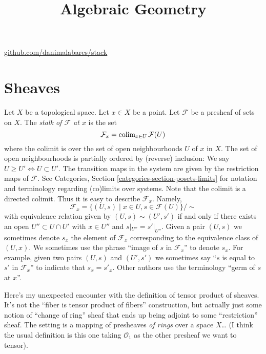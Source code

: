 



\title{Algebraic Geometry}
\maketitle

\label{section-phantom}
\hfill
\href{http://github.com/danimalabares/stack}{github.com/danimalabares/stack}

\tableofcontents

\section{Sheaves}
\label{section-sheaves}

Let $X$ be a topological space. Let $x \in X$ be a point.
Let $\mathcal{F}$ be a presheaf of sets on $X$.
The {\it stalk of $\mathcal{F}$ at $x$} is the set
$$
\mathcal{F}_x
=
\mathop{\mathrm{colim}}\nolimits_{x\in U} \mathcal{F}(U)
$$
where the colimit is over the set of open neighbourhoods
$U$ of $x$ in $X$. The set of open neighbourhoods is
partially ordered by (reverse) inclusion:
We say $U \geq U' \Leftrightarrow U \subset U'$.
The transition maps in the system are
given by the restriction maps of $\mathcal{F}$.
See Categories, Section \ref{categories-section-posets-limits}
for notation and terminology regarding (co)limits over systems.
Note that the colimit is a directed colimit.
Thus it is easy to describe $\mathcal{F}_x$. Namely,
$$
\mathcal{F}_x
=
\{
(U, s)
\mid
x\in U, s\in \mathcal{F}(U)
\}/\sim
$$
with equivalence relation given by $(U, s) \sim (U', s')$ if and only if
there exists an open $U'' \subset U \cap U'$ with $x \in U''$ and
$s|_{U''} = s'|_{U''}$. Given a pair $(U, s)$ we sometimes denote
$s_x$ the element of $\mathcal{F}_x$ corresponding to the equivalence
class of $(U, x)$. We sometimes use the phrase
``image of $s$ in $\mathcal{F}_x$'' to denote $s_x$.
For example, given two pairs $(U, s)$ and $(U', s')$ we sometimes
say ``$s$ is equal to $s'$ in $\mathcal{F}_x$'' to indicate
that $s_x = s'_x$. Other authors use the terminology
``germ of $s$ at $x$''.

\bigskip\noindent

Here's my unexpected encounter with the definition of tensor product of sheaves.
It's not the ``fiber is tensor product of fibers'' construction, but actually
just some notion of ``change of ring'' sheaf that ends up being adjoint to
some ``restriction'' sheaf. The setting is a mapping of presheaves {\it of
rings} over a space $X$… (I think the usual definition is this one taking
$\mathcal{O}_1$ as the other presheaf we want to tensor).


